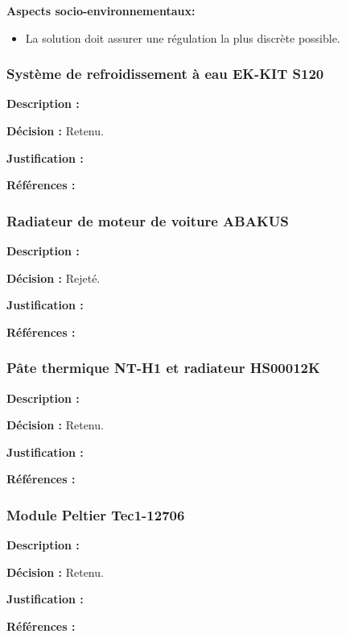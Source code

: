 \textbf{Aspects socio-environnementaux:}
\begin{itemize}[label = {--}]
    \item La solution doit assurer une régulation la plus discrète possible.
\end{itemize}

\subsubsection{Système de refroidissement à eau EK-KIT S120}

\textbf{Description :} 

\textbf{Décision :} Retenu.

\textbf{Justification :}

\textbf{Références :}

\subsubsection{Radiateur de moteur de voiture ABAKUS}
\textbf{Description :} 

\textbf{Décision :} Rejeté.

\textbf{Justification :} 

\textbf{Références :} 

\subsubsection{Pâte thermique NT-H1 et radiateur HS00012K}

\textbf{Description :} 

\textbf{Décision :} Retenu.

\textbf{Justification :} 

\textbf{Références :} 

\subsubsection{Module Peltier Tec1-12706}
\textbf{Description :} 

\textbf{Décision :} Retenu.

\textbf{Justification :} 

\textbf{Références :} 

\begin{table}[!htb]
\footnotesize
\centering
{}
\caption{Faisabilité des concepts pour la génération de l'alarme}
\label{t:Decision_alarme}
\end{table}